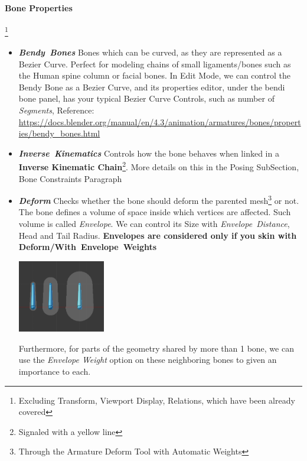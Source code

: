 \documentclass{article}
\begin{document}
\paragraph{Bone Properties}\footnote{Excluding Transform, Viewport Display, Relations, which have been already covered}
\begin{itemize}[topsep=0pt, noitemsep]
    \item \mbox{\textit{\textbf{Bendy Bones}}} Bones which can be curved, as they are represented as a Bezier Curve. Perfect for modeling chains of small ligaments/bones such as the Human spine column or
    facial bones. In Edit Mode, we can control the Bendy Bone as a Bezier Curve, and its properties editor, under the bendi bone panel, has your typical Bezier Curve Controls, such as number 
    of \textit{Segments}, Reference: \href{https://docs.blender.org/manual/en/4.3/animation/armatures/bones/properties/bendy_bones.html}{https://docs.blender.org/manual/en/4.3/animation/armatures/bones/properties/bendy\_bones.html}
    \item \mbox{\textit{\textbf{Inverse Kinematics}}} Controls how the bone behaves when linked in a \textbf{Inverse Kinematic Chain}\footnote{Signaled with a yellow line}. More details on this in the 
    Posing SubSection, Bone Constraints Paragraph
    \item \mbox{\textit{\textbf{Deform}}} Checks whether the bone should deform the parented mesh\footnote{Through the Armature Deform Tool with Automatic Weights} or not. The bone defines a volume of 
    space inside which vertices are affected. Such volume is called \textit{Envelope}. We can control its Size with \mbox{\textit{Envelope Distance}}, Head and Tail Radius. \textbf{Envelopes are 
    considered only if you skin with \mbox{Deform/With Envelope Weights}}
    \begin{center}
        \includegraphics[width=0.3\textwidth]{blender_docs_images/animation_armatures_bones_properties_deform_envelope-distance.png}
    \end{center}
    Furthermore, for parts of the geometry shared by more than 1 bone, we can use the \textit{Envelope Weight} option on these neighboring bones to given an importance to each.
\end{itemize}
\end{document}
